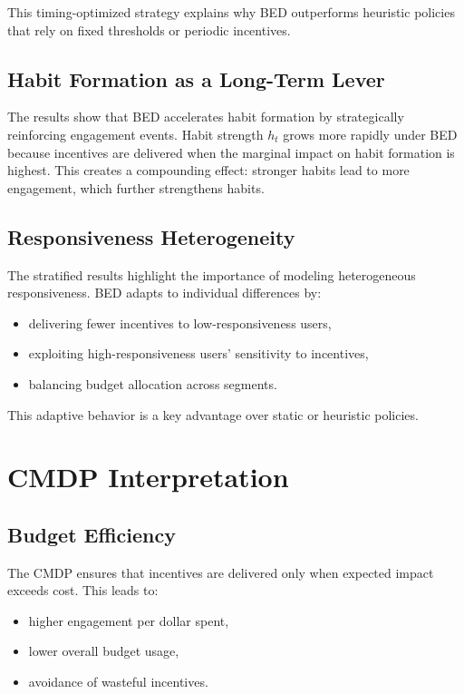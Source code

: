 This timing-optimized strategy explains why BED outperforms heuristic policies
that rely on fixed thresholds or periodic incentives.

\subsection{Habit Formation as a Long-Term Lever}

The results show that BED accelerates habit formation by strategically
reinforcing engagement events. Habit strength $h_t$ grows more rapidly under BED
because incentives are delivered when the marginal impact on habit formation is
highest. This creates a compounding effect: stronger habits lead to more
engagement, which further strengthens habits.

\subsection{Responsiveness Heterogeneity}

The stratified results highlight the importance of modeling heterogeneous
responsiveness. BED adapts to individual differences by:

\begin{itemize}
    \item delivering fewer incentives to low-responsiveness users,
    \item exploiting high-responsiveness users’ sensitivity to incentives,
    \item balancing budget allocation across segments.
\end{itemize}

This adaptive behavior is a key advantage over static or heuristic policies.

\section{CMDP Interpretation}

\subsection{Budget Efficiency}

The CMDP ensures that incentives are delivered only when expected impact exceeds
cost. This leads to:

\begin{itemize}
    \item higher engagement per dollar spent,
    \item lower overall budget usage,
    \item avoidance of wasteful incentives.
\end{itemize}

